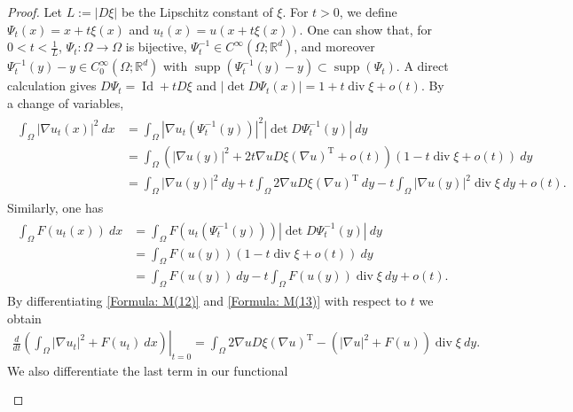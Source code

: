 \documentclass[11pt,reqno]{amsart}
\begin{document}
\begin{proof}
	Let $L:=|D\xi|$ be the Lipschitz constant of $\xi$. For $t>0$, we define $\Psi_{t}(x)=x+t\xi(x)$ and $u_{t}(x)=u(x+t\xi(x))$. One can show that, for $0<t<\frac{1}{L}$, $\Psi_{t}\colon\Omega\to\Omega$ is bijective, $\Psi_{t}^{-1}\in C^{\infty}(\Omega;\mathbb{R}^{d})$, and moreover $\Psi_{t}^{-1}(y)-y\in C_{0}^{\infty}(\Omega;\mathbb{R}^{d})$ with  $\operatorname{supp}(\Psi_{t}^{-1}(y)-y)\subset\operatorname{supp}(\Psi_{t})$. A direct calculation gives $D\Psi_{t}=\operatorname{Id}+tD\xi$ and $|\det D\Psi_{t}(x)|=1+t\operatorname{div}\xi+o(t)$.
    By a change of variables,
    \begin{align}\label{Formula: M(12)}
    	\begin{alignedat}{4}
    		\int_{\Omega}|\nabla u_{t}(x)|^{2}\:dx&=\int_{\Omega}|\nabla u_{t}(\Psi_{t}^{-1}(y))|^{2}|\det D\Psi_{t}^{-1}(y)|\:dy\\
    		&=\int_{\Omega}(|\nabla u(y)|^{2}+2t\nabla uD\xi(\nabla u)^{\mathrm{T}}+o(t))(1-t\operatorname{div}\xi+o(t))\:dy\\
    		&=\int_{\Omega}|\nabla u(y)|^{2}\:dy+t\int_{\Omega}2\nabla uD\xi(\nabla u)^{\mathrm{T}}\:dy-t\int_{\Omega}|\nabla u(y)|^{2}\operatorname{div}\xi\:dy+o(t).
    	\end{alignedat}
    \end{align}
    Similarly, one has
    \begin{align}\label{Formula: M(13)}
    	\begin{alignedat}{3}
    		\int_{\Omega}F(u_{t}(x))\:dx&=\int_{\Omega}F(u_{t}(\Psi_{t}^{-1}(y)))|\det D\Psi_{t}^{-1}(y)|\:dy\\
    		&=\int_{\Omega}F(u(y))(1-t\operatorname{div}\xi+o(t))\:dy\\
    		&=\int_{\Omega}F(u(y))\:dy-t\int_{\Omega}F(u(y))\operatorname{div}\xi\:dy+o(t).
    	\end{alignedat}    	
    \end{align}
    By differentiating \eqref{Formula: M(12)} and \eqref{Formula: M(13)} with respect to $t$ we obtain
    \begin{align}\label{Formula: M(13')}
        \left.\frac{d}{dt}\left(\int_{\Omega}|\nabla u_{t}|^{2}+F(u_{t})\:dx\right)\right|_{t=0}=\int_{\Omega}2\nabla uD\xi(\nabla u)^{\mathrm{T}}-(|\nabla u|^{2}+F(u))\operatorname{div}\xi\:dy.
    \end{align}
    We also differentiate the last term in our functional
    \begin{align}\label{Formula: M(14)}
       \begin{alignedat}{2}

\end{alignedat}
\end{align}
\end{proof}
\end{document}
